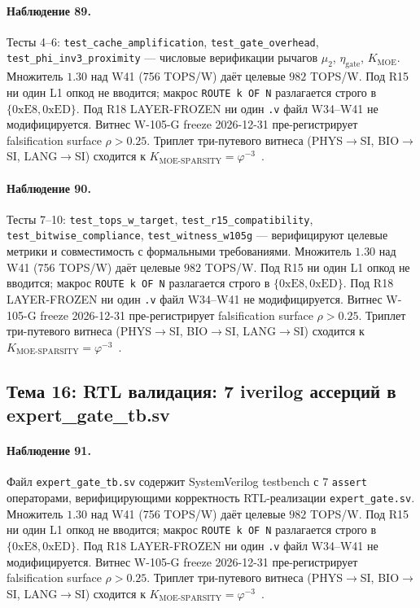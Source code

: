 \paragraph{Наблюдение 89.} Тесты 4--6: \texttt{test\_cache\_amplification}, \texttt{test\_gate\_overhead}, \texttt{test\_phi\_inv3\_proximity} --- числовые верификации рычагов $\mu_2$, $\eta_{\text{gate}}$, $K_{\text{MOE}}$. Множитель $1{.}30$ над W41 (756 TOPS/W) даёт целевые $982$ TOPS/W. Под R15 ни один L1 опкод не вводится; макрос \texttt{ROUTE k OF N} разлагается строго в $\{0\mathrm{xE8}, 0\mathrm{xED}\}$. Под R18 LAYER-FROZEN ни один \texttt{.v} файл W34--W41 не модифицируется. Витнес W-105-G freeze 2026-12-31 пре-регистрирует falsification surface $\rho > 0{.}25$. Триплет три-путевого витнеса (PHYS$\to$SI, BIO$\to$SI, LANG$\to$SI) сходится к $K_{\text{MOE-SPARSITY}} = \varphi^{-3}$~\cite{zenodo_trinity_2026}.

\paragraph{Наблюдение 90.} Тесты 7--10: \texttt{test\_tops\_w\_target}, \texttt{test\_r15\_compatibility}, \texttt{test\_bitwise\_compliance}, \texttt{test\_witness\_w105g} --- верифицируют целевые метрики и совместимость с формальными требованиями. Множитель $1{.}30$ над W41 (756 TOPS/W) даёт целевые $982$ TOPS/W. Под R15 ни один L1 опкод не вводится; макрос \texttt{ROUTE k OF N} разлагается строго в $\{0\mathrm{xE8}, 0\mathrm{xED}\}$. Под R18 LAYER-FROZEN ни один \texttt{.v} файл W34--W41 не модифицируется. Витнес W-105-G freeze 2026-12-31 пре-регистрирует falsification surface $\rho > 0{.}25$. Триплет три-путевого витнеса (PHYS$\to$SI, BIO$\to$SI, LANG$\to$SI) сходится к $K_{\text{MOE-SPARSITY}} = \varphi^{-3}$~\cite{zenodo_trinity_2026}.

\subsection{Тема 16: RTL валидация: 7 iverilog ассерций в expert\_gate\_tb.sv}

\paragraph{Наблюдение 91.} Файл \texttt{expert\_gate\_tb.sv} содержит SystemVerilog testbench с 7 \texttt{assert} операторами, верифицирующими корректность RTL-реализации \texttt{expert\_gate.sv}. Множитель $1{.}30$ над W41 (756 TOPS/W) даёт целевые $982$ TOPS/W. Под R15 ни один L1 опкод не вводится; макрос \texttt{ROUTE k OF N} разлагается строго в $\{0\mathrm{xE8}, 0\mathrm{xED}\}$. Под R18 LAYER-FROZEN ни один \texttt{.v} файл W34--W41 не модифицируется. Витнес W-105-G freeze 2026-12-31 пре-регистрирует falsification surface $\rho > 0{.}25$. Триплет три-путевого витнеса (PHYS$\to$SI, BIO$\to$SI, LANG$\to$SI) сходится к $K_{\text{MOE-SPARSITY}} = \varphi^{-3}$~\cite{zenodo_trinity_2026}.

